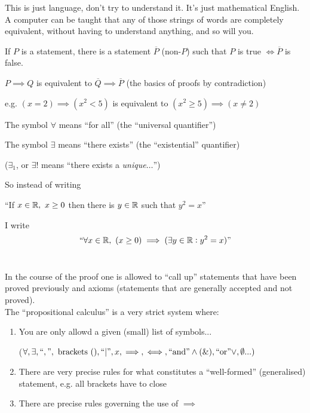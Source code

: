 \documentclass[twoside]{scrartcl}
\begin{document}
This is just language, don't try to understand it. It's just mathematical English. A computer can be taught that any of those strings of words are completely equivalent, without having to understand anything, and so will you. \\


If $P$ is a statement, there is a statement $\overline{P}$ (non-$P$) such that $P$ is true $\iff \overline{P}$ is false. 

$P \implies Q$ is equivalent to $\overline{Q} \implies \overline{P}$ (the basics of proofs by contradiction) 

e.g. $(x=2) \implies (x^2 < 5)$ is equivalent to $(x^2\geq 5) \implies (x \neq 2)$\\


\vspace*{5pt}
\begin{definition} The symbol $\forall$ means ``for all'' (the ``universal quantifier'')

The symbol $\exists$ means ``there exists'' (the ``existential'' quantifier)

($\exists_1$, or $\exists!$ means ``there exists a \emph{unique}$\dots$'')
\end{definition}


So instead of writing 
\begin{center}
``If $x \in\mathbb{R},~x\geq 0$ then there is $y\in\mathbb{R}$ such that $y^2 = x$''
\end{center}

I write 
\[``\forall x \in\mathbb{R},~(x\geq 0) \implies (\exists y\in\mathbb{R}: y^2 = x)"\]~

In the course of the proof one is allowed to ``call up'' statements that have been proved previously and axioms (statements that are generally accepted and not proved).\\

The ``propositional calculus'' is a very strict system where:
\begin{enumerate}
\item You are only allowd a given (small) list of symbols...

($\forall, \exists, ``,", \mbox{ brackets } (), ``|", x, \implies, \iff, ``\text{and}" \wedge (\text{\&}),``\text{or}" \vee, \emptyset...)$

\item There are very precise rules for what constitutes a ``well-formed'' (generalised) statement, e.g. all brackets have to close

\item There are precise rules governing the use of $\implies$

\end{enumerate}
\vspace*{15pt}
\end{document}
